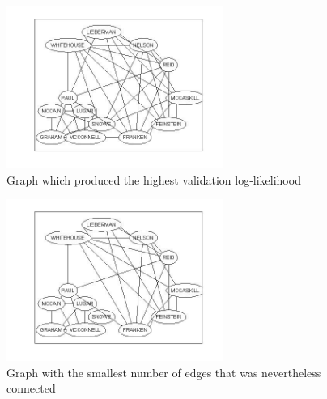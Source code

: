 \documentclass[]{article}
\begin{document}
\begin{figure}
\begin{center}
\includegraphics[width=200pt]{fig4.jpg}
\caption{Graph which produced the highest validation log-likelihood}
\end{center}
\end{figure}

\begin{figure}
\begin{center}
\includegraphics[width=200pt]{fig5.jpg}
\caption{Graph with the smallest number of edges that was nevertheless connected}
\end{center}
\end{figure}
\end{document}
